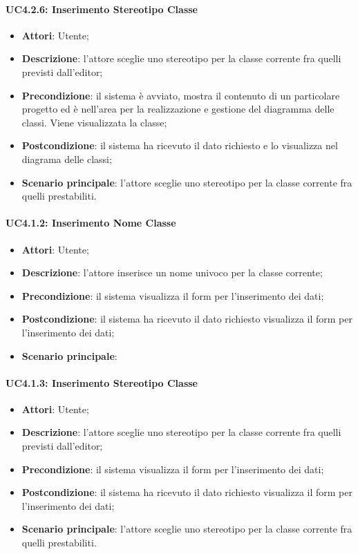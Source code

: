 \begin{itemize}
\begin{itemize}
\begin{itemize}
\begin{itemize}
\paragraph{UC4.2.6: Inserimento Stereotipo Classe}
\label{UC4.2.6}
\begin{itemize}
	\item \textbf{Attori}: Utente;
	\item \textbf{Descrizione}: l'attore sceglie uno stereotipo per la classe corrente fra quelli previsti dall'editor;
	\item \textbf{Precondizione}: il sistema è avviato, mostra il contenuto di un particolare progetto ed è nell'area per la realizzazione e gestione del diagramma delle classi. Viene visualizzata la classe;
	\item \textbf{Postcondizione}: il sistema ha ricevuto il dato richiesto e lo visualizza nel diagrama delle classi;
	\item \textbf{Scenario principale}: l'attore sceglie uno stereotipo per la classe corrente fra quelli prestabiliti.
\end{itemize}



\paragraph{UC4.1.2: Inserimento Nome Classe}
\label{UC4.1.2}
\begin{itemize}
	\item \textbf{Attori}: Utente;
	\item \textbf{Descrizione}: l'attore inserisce un nome univoco per la classe corrente;
	\item \textbf{Precondizione}: il sistema visualizza il form per l'inserimento dei dati;
	\item \textbf{Postcondizione}: il sistema ha ricevuto il dato richiesto visualizza il form per l'inserimento dei dati;
	\item \textbf{Scenario principale}: 
\end{itemize}

\paragraph{UC4.1.3: Inserimento Stereotipo Classe}
\label{UC4.1.3}
\begin{itemize}
	\item \textbf{Attori}: Utente;
	\item \textbf{Descrizione}: l'attore sceglie uno stereotipo per la classe corrente fra quelli previsti dall'editor;
	\item \textbf{Precondizione}: il sistema visualizza il form per l'inserimento dei dati;
	\item \textbf{Postcondizione}: il sistema ha ricevuto il dato richiesto visualizza il form per l'inserimento dei dati;
	\item \textbf{Scenario principale}: l'attore sceglie uno stereotipo per la classe corrente fra quelli prestabiliti.
\end{itemize}


\end{itemize}
\end{itemize}
\end{itemize}
\end{itemize}
